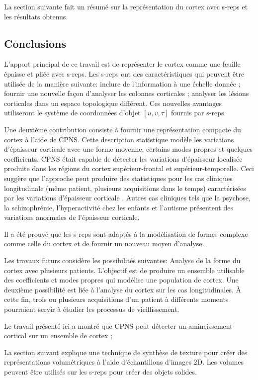 La section suivante fait un résumé sur la représentation du cortex avec s-reps
et les résultats obtenus.

\subsection{Conclusions}

L'apport principal de ce travail est de représenter le cortex comme une feuille épaisse et pliée
avec s-reps.
Les s-reps ont des caractéristiques qui peuvent être utilisée de la manière suivante:
inclure de l'information à une échelle donnée ; 
fournir une nouvelle façon d'analyser les colonnes corticales ;
analyser les lésions corticales dans un espace topologique différent.
Ces nouvelles avantages utiliseront le système de coordonnées d'objet $[u, v, \tau] $ fournis par s-reps.

Une deuxième contribution consiste à fournir une représentation compacte du cortex à l'aide de CPNS.
Cette description statistique modèle les variations d'épaisseur corticale avec une forme moyenne, certains modes propres et quelques coefficients.
CPNS était capable de détecter les variations d'épaisseur localisée produite
dans les régions du cortex supérieur-frontal et supérieur-temporelle.
Ceci suggère que l'approche peut
produire des statistiques pour les cas cliniques longitudinale (même patient, plusieurs acquisitions dans le temps)
caractérisées par les variations d'épaisseur corticale \cite{doi:10.1080/13803390802635174}.
Autres cas cliniques tels que la psychose, la schizophrénie, l'hyperactivité chez les enfants et l'autisme
présentent des variations anormales de l'épaisseur corticale.

Il a été prouvé que les s-reps sont adaptés
à la modélisation de formes complexe comme celle du cortex et de fournir un nouveau moyen d'analyse.

Les travaux futurs considère les possibilités suivantes:
Analyse de la forme du cortex avec 
plusieurs patients. L'objectif est de produire un ensemble utilisable des coefficients
et modes propres qui modélise une population de cortex.
Une deuxième possibilité est liée à l'analyse du cortex sur les cas longitudinales.
À cette fin, trois ou plusieurs acquisitions d'un patient à différents moments pourraient servir
à étudier les processus de vieillissement.

Le travail présenté ici a montré que CPNS peut détecter un amincissement cortical sur un ensemble de cortex ;

La section suivant explique une technique de synthèse de texture pour créer 
des représentations volumétriques à l'aide
d'échantillons d'images 2D. Les volumes peuvent être utilisés sur les s-reps pour créer
des objets solides.

